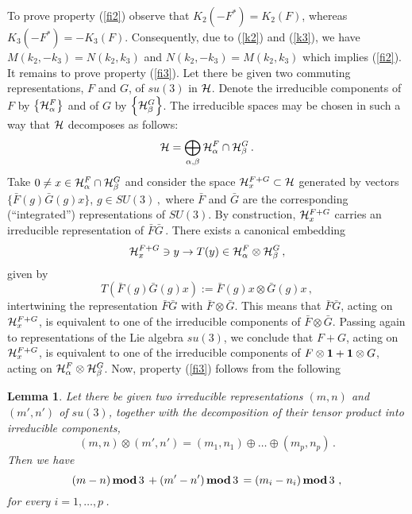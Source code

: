 \documentclass[a4paper,12pt]{article}
\newtheorem{lemma}{Lemma}
\begin{document}
To prove property (\ref{fi2}) observe that  $K_2(-F^*) = K_2(F)$,
whereas $K_3(-F^*) = - K_3(F)$. Consequently, due to (\ref{k2})
and (\ref{k3}), we have $M(k_2,-k_3) = N(k_2,k_3)$ and
$N(k_2,-k_3) = M(k_2,k_3)$ which implies (\ref{fi2}). It remains
to prove property (\ref{fi3}). Let there be given two commuting
representations, $F$ and $G$, of $su(3)$ in $\cal H$. Denote the
irreducible components of $F$ by $\left\{ {\cal H}^F_{\alpha}
\right\}$ and of $G$ by $\left\{ {\cal H}^G_{\beta} \right\}$. The
irreducible spaces may be chosen in such a way that $\cal H$
decomposes as follows:
\begin{equation}
{\cal H} = \bigoplus_{\alpha , \beta} {\cal H}^F_{\alpha} \cap
{\cal H}^G_{\beta} \, .
\end{equation}
Take $0 \neq x \in {\cal H}^F_{\alpha} \cap {\cal H}^G_{\beta}$
and consider the space ${\cal H}^{F + G}_x \subset {\cal H}$
generated by vectors $\{ {\bar F}(g){\bar G}(g)x\}$, $g \in SU(3)
\, ,$ where ${\bar F}$ and ${\bar G}$ are the corresponding
(``integrated'') representations of $SU(3)$. By construction,
${\cal H}^{F + G}_x$ carries an irreducible representation of
${\bar F}{\bar G}\, .$ There exists a canonical embedding
\begin{equation}
{\cal H}^{F + G}_x \ni y \rightarrow T(y) \in {\cal H}^F_{\alpha}
\otimes {\cal H}^G_{\beta} \, ,
\end{equation}
given by
\begin{equation}
T \left( {\bar F}(g){\bar G}(g)x \right):= {\bar F}(g)x \otimes
{\bar G}(g) x\, ,
\end{equation}
intertwining the representation ${\bar F}{\bar G}$ with ${\bar
F}\otimes {\bar G}$. This means that ${\bar F}{\bar G}$, acting on
${\cal H}^{F + G}_x$, is equivalent to one of the irreducible
components of ${\bar F}\otimes {\bar G}$. Passing again to
representations of the Lie algebra $su(3)$, we conclude that $F +
G$, acting on ${\cal H}^{F + G}_x$, is equivalent to one of the
irreducible components of $F \otimes {\bf 1} + {\bf 1} \otimes G$,
acting on ${\cal H}^F_{\alpha} \otimes {\cal H}^G_{\beta}$. Now,
property (\ref{fi3}) follows from the following
\begin{lemma}
Let there be given two irreducible representations $(m,n)$ and
$(m',n')$ of $su(3)$, together with the decomposition of their
tensor product into irreducible components,
\begin{equation}
(m,n) \otimes (m',n') = (m_1,n_1) \oplus \dots \oplus (m_p,n_p) \,
.
\end{equation}
Then we have
\begin{equation}
(m - n)  \, \mbox{\rm \bf mod} \, 3 \, + (m' - n')  \, \mbox{\rm
\bf mod} \, 3 \, = (m_i - n_i)  \, \mbox{\rm \bf mod} \, 3 \,\, ,
\end{equation}
for every $i = 1, \dots , p\ $.
\end{lemma}
\end{document}
